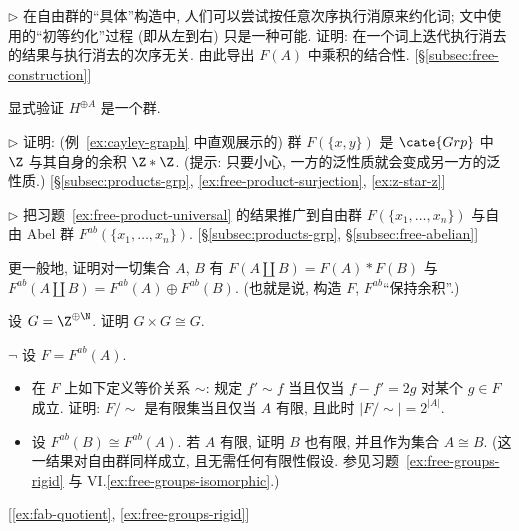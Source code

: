 \begin{prob}
\label{ex:reduction-order}
$\triangleright$ 在自由群的``具体''构造中, 人们可以尝试按任意次序执行消原来约化词; 文中使用的``初等约化''过程 (即从左到右) 只是一种可能. 证明: 在一个词上迭代执行消去的结果与执行消去的次序无关. 由此导出 $F(A)$ 中乘积的结合性. [\S\ref{subsec:free-construction}]
\end{prob}

\begin{prob}
\label{ex:H-oplus-A}
显式验证 $H^{\oplus A}$ 是一个群.
\end{prob}

\begin{prob}
\label{ex:free-product-universal}
$\triangleright$ 证明: (例~\ref{ex:cayley-graph} 中直观展示的) 群 $F(\{x, y\})$ 是 $\cate{Grp}$ 中 $\Z$ 与其自身的余积 $\Z * \Z$. (提示: 只要小心, 一方的泛性质就会变成另一方的泛性质.) [\S\ref{subsec:products-grp}, \ref{ex:free-product-surjection}, \ref{ex:z-star-z}]
\end{prob}

\begin{prob}
\label{ex:z-star-z}
$\triangleright$ 把习题~\ref{ex:free-product-universal} 的结果推广到自由群 $F(\{x_1, \ldots, x_n\})$ 与自由 Abel 群 $F^{ab}(\{x_1, \ldots, x_n\})$. [\S\ref{subsec:products-grp}, \S\ref{subsec:free-abelian}]
\end{prob}

\begin{prob}
\label{ex:F-preserves-coproducts}
更一般地, 证明对一切集合 $A$, $B$ 有 $F(A \amalg B) = F(A) * F(B)$ 与 $F^{ab}(A \amalg B) = F^{ab}(A) \oplus F^{ab}(B)$. (也就是说, 构造 $F$, $F^{ab}$``保持余积''.)
\end{prob}

\begin{prob}
\label{ex:G-plus-G}
设 $G = \Z^{\oplus \N}$. 证明 $G \times G \cong G$.
\end{prob}

\begin{prob}
\label{ex:Fab-mod-2}
$\neg$ 设 $F = F^{ab}(A)$.
\begin{itemize}
	\item 在 $F$ 上如下定义等价关系 $\sim$: 规定 $f' \sim f$ 当且仅当 $f - f' = 2g$ 对某个 $g \in F$ 成立. 证明: $F / {\sim}$ 是有限集当且仅当 $A$ 有限, 且此时 $|F / {\sim}| = 2^{|A|}$.
	\item 设 $F^{ab}(B) \cong F^{ab}(A)$. 若 $A$ 有限, 证明 $B$ 也有限, 并且作为集合 $A \cong B$. (这一结果对自由群同样成立, 且无需任何有限性假设. 参见习题~\ref{ex:free-groups-rigid} 与 VI.\ref{ex:free-groups-isomorphic}.)
\end{itemize}
[\ref{ex:fab-quotient}, \ref{ex:free-groups-rigid}]
\end{prob}

